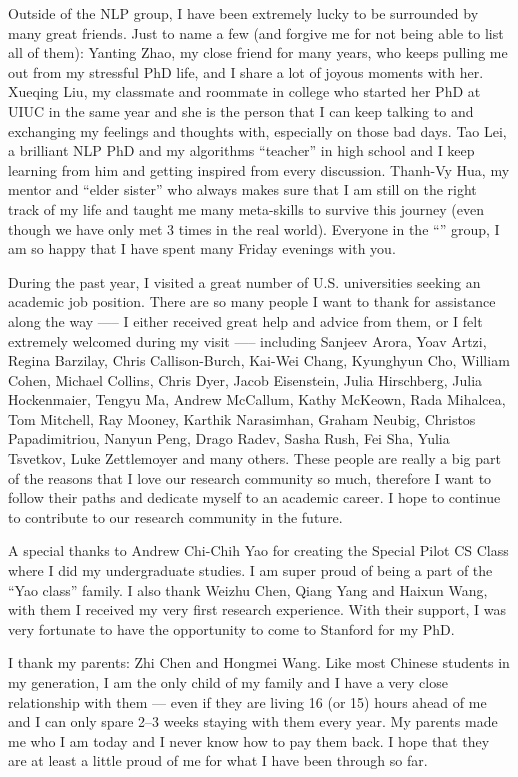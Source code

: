 Outside of the NLP group, I have been extremely lucky to be surrounded by many great friends. Just to name a few (and forgive me for not being able to list all of them): Yanting Zhao, my close friend for many years, who keeps pulling me out from my stressful PhD life, and I share a lot of joyous moments with her. Xueqing Liu, my classmate and roommate in college who started her PhD at UIUC in the same year and she is the person that I can keep talking to and exchanging my feelings and thoughts with, especially on those bad days. Tao Lei, a brilliant NLP PhD and my algorithms ``teacher'' in high school and I keep learning from him and getting inspired from every discussion. Thanh-Vy Hua, my mentor and ``elder sister'' who always makes sure that I am still on the right track of my life and taught me many meta-skills to survive this journey (even though we have only met 3 times in the real world). Everyone in the ``'' group, I am so happy that I have spent many Friday evenings with you.

During the past year, I visited a great number of U.S. universities seeking an academic job position. There are so many people I want to thank for assistance along the way —-- I either received great help and advice from them, or I felt extremely welcomed during my visit —-- including Sanjeev Arora, Yoav Artzi, Regina Barzilay, Chris Callison-Burch, Kai-Wei Chang, Kyunghyun Cho, William Cohen, Michael Collins, Chris Dyer, Jacob Eisenstein, Julia Hirschberg, Julia Hockenmaier, Tengyu Ma, Andrew McCallum, Kathy McKeown, Rada Mihalcea, Tom Mitchell, Ray Mooney, Karthik Narasimhan, Graham Neubig, Christos Papadimitriou, Nanyun Peng, Drago Radev, Sasha Rush, Fei Sha, Yulia Tsvetkov, Luke Zettlemoyer and many others. These people are really a big part of the reasons that I love our research community so much, therefore I want to follow their paths and dedicate myself to an academic career. I hope to continue to contribute to our research community in the future.

A special thanks to Andrew Chi-Chih Yao for creating the Special Pilot CS Class where I did my undergraduate studies. I am super proud of being a part of the ``Yao class'' family. I also thank Weizhu Chen, Qiang Yang and Haixun Wang, with them I received my very first research experience. With their support, I was very fortunate to have the opportunity to come to Stanford for my PhD.

I thank my parents: Zhi Chen and Hongmei Wang. Like most Chinese students in my generation, I am the only child of my family and I have a very close relationship with them --- even if they are living 16 (or 15) hours ahead of me and I can only spare 2--3 weeks staying with them every year. My parents made me who I am today and I never know how to pay them back. I hope that they are at least a little proud of me for what I have been through so far.

